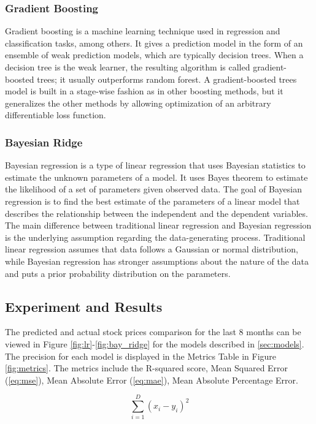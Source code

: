 \documentclass[conference]{IEEEtran}
\begin{document}
\subsubsection{Gradient Boosting}
Gradient boosting is a machine learning technique used in regression and classification tasks, among others.
It gives a prediction model in the form of an ensemble of weak prediction models, which are typically decision trees.
When a decision tree is the weak learner, the resulting algorithm is called gradient-boosted trees; it usually outperforms random forest.
A gradient-boosted trees model is built in a stage-wise fashion as in other boosting methods, but it generalizes the other methods by allowing optimization of an arbitrary differentiable loss function.

\subsubsection{Bayesian Ridge}
Bayesian regression is a type of linear regression that uses Bayesian statistics to estimate the unknown parameters of a model.
It uses Bayes theorem to estimate the likelihood of a set of parameters given observed data.
The goal of Bayesian regression is to find the best estimate of the parameters of a linear model that describes the relationship between the independent and the dependent variables.
The main difference between traditional linear regression and Bayesian regression is the underlying assumption regarding the data-generating process.
Traditional linear regression assumes that data follows a Gaussian or normal distribution, while Bayesian regression has stronger assumptions about the nature of the data and puts a prior probability distribution on the parameters.

\subsection{Experiment and Results}

The predicted and actual stock prices comparison for the last 8 months can be viewed in Figure \ref{fig:lr}-\ref{fig:bay_ridge} for the models described in \ref{sec:models}.
The precision for each model is displayed in the Metrics Table in Figure \ref{fig:metrics}.
The metrics include the R-squared score, Mean Squared Error (\ref{eq:mse}), Mean Absolute Error (\ref{eq:mae}), Mean Absolute Percentage Error.

\begin{equation}
    \sum_{i=1}^{D}(x_i-y_i)^2
    \label{eq:mse}
\end{equation}
\end{document}
